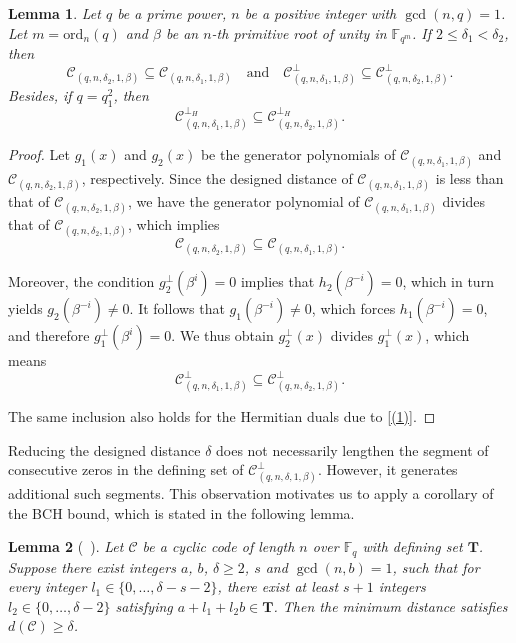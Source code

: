\documentclass[10pt,a4paper]{amsart}
\newtheorem{lemma}{Lemma}
\begin{document}
\begin{lemma}
    \label{contain}
    Let $q$ be a prime power, $n$ be a positive integer with $\gcd(n,q)=1$. Let $m=\text{ord}_n(q)$ and $\beta$ be an $n$-th primitive root of unity in $\mathbb{F}_{q^m}$. If $2\le\delta_1<\delta_2$,
    then
    \[
    \mathcal{C}_{(q,n,\delta_2,1,\beta)}\subseteq\mathcal{C}_{(q,n,\delta_1,1,\beta)}
    \quad \text{and} \quad
    \mathcal{C}^\perp_{(q,n,\delta_1,1,\beta)}\subseteq\mathcal{C}^\perp_{(q,n,\delta_2,1,\beta)}.
    \]
    Besides, if $q=q_1^2$, then \[\mathcal{C}^{\perp_H}_{(q,n,\delta_1,1,\beta)}\subseteq\mathcal{C}^{\perp_H}_{(q,n,\delta_2,1,\beta)}.\]
\end{lemma}

\begin{proof}
Let $g_1(x)$ and $g_2(x)$ be the generator polynomials of $\mathcal{C}_{(q,n,\delta_1,1,\beta)}$ and $\mathcal{C}_{(q,n,\delta_2,1,\beta)}$, respectively. Since the designed distance of $\mathcal{C}_{(q,n,\delta_1,1,\beta)}$ is less than that of $\mathcal{C}_{(q,n,\delta_2,1,\beta)}$, we have the generator polynomial of $\mathcal{C}_{(q,n,\delta_1,1,\beta)}$ divides that of $\mathcal{C}_{(q,n,\delta_2,1,\beta)}$, which implies
\[
\mathcal{C}_{(q,n,\delta_2,1,\beta)} \subseteq \mathcal{C}_{(q,n,\delta_1,1,\beta)}.
\]

Moreover, the condition
\(
g_2^\perp(\beta^i) = 0 \) implies that $h_2(\beta^{-i}) = 0$, which in turn yields $g_2(\beta^{-i}) \ne 0$.
It follows that $g_1(\beta^{-i}) \ne 0$, which forces $h_1(\beta^{-i}) = 0$, and therefore $g_1^\perp(\beta^i) = 0$. We thus obtain $g_2^\perp(x)$ divides $g_1^\perp(x)$, which means
\[
\mathcal{C}^\perp_{(q,n,\delta_1,1,\beta)} \subseteq \mathcal{C}^\perp_{(q,n,\delta_2,1,\beta)}.
\]

The same inclusion also holds for the Hermitian duals due to \eqref{(1)}.
\end{proof}

Reducing the designed distance $\delta$ does not necessarily lengthen the segment of consecutive zeros in the defining set of $\mathcal{C}^\perp_{(q,n,\delta,1,\beta)}$. However, it generates additional such segments. This observation motivates us to apply a corollary of the BCH bound, which is stated in the following lemma.

\begin{lemma}[~\cite{Blahut2003Algebraic}]
\label{Roos bound}
Let $\mathcal{C}$ be a cyclic code of length $n$ over $\mathbb{F}_q$ with defining set $\mathbf{T}$.
Suppose there exist integers $a$, $b$, $\delta\ge 2$, $s$ and $\gcd(n,b)=1$, such that for every integer $l_1\in \{0,\dots,\delta-s-2\}$, there exist at least $s+1$ integers $l_2\in\{0,\dots,\delta-2\}$ satisfying $a+l_1+l_2b\in \textbf{T}$. Then the minimum distance satisfies $d(\mathcal{C})\ge \delta$.
\end{lemma}
\end{document}
